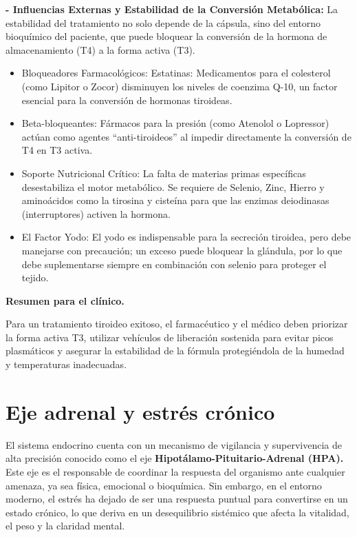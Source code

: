 \documentclass[
  spanish,
]{article}
\begin{document}
\textbf{- Influencias Externas y Estabilidad de la Conversión Metabólica:} La estabilidad del tratamiento no solo depende de la cápsula, sino del entorno bioquímico del paciente, que puede bloquear la conversión de la hormona de almacenamiento (T4) a la forma activa (T3).

\begin{itemize}
\item
  Bloqueadores Farmacológicos:
  Estatinas: Medicamentos para el colesterol (como Lipitor o Zocor) disminuyen los niveles de coenzima Q-10, un factor esencial para la conversión de hormonas tiroideas.
\item
  Beta-bloqueantes: Fármacos para la presión (como Atenolol o Lopressor) actúan como agentes ``anti-tiroideos'' al impedir directamente la conversión de T4 en T3 activa.
\item
  Soporte Nutricional Crítico: La falta de materias primas específicas desestabiliza el motor metabólico. Se requiere de Selenio, Zinc, Hierro y aminoácidos como la tirosina y cisteína para que las enzimas deiodinasas (interruptores) activen la hormona.
\item
  El Factor Yodo: El yodo es indispensable para la secreción tiroidea, pero debe manejarse con precaución; un exceso puede bloquear la glándula, por lo que debe suplementarse siempre en combinación con selenio para proteger el tejido.
\end{itemize}

\textbf{Resumen para el clínico.}

Para un tratamiento tiroideo exitoso, el farmacéutico y el médico deben priorizar la forma activa T3, utilizar vehículos de liberación sostenida para evitar picos plasmáticos y asegurar la estabilidad de la fórmula protegiéndola de la humedad y temperaturas inadecuadas.

\section{Eje adrenal y estrés crónico}\label{eje-adrenal-y-estruxe9s-cruxf3nico}

El sistema endocrino cuenta con un mecanismo de vigilancia y supervivencia de alta precisión conocido como el eje \textbf{Hipotálamo-Pituitario-Adrenal (HPA).} Este eje es el responsable de coordinar la respuesta del organismo ante cualquier amenaza, ya sea física, emocional o bioquímica. Sin embargo, en el entorno moderno, el estrés ha dejado de ser una respuesta puntual para convertirse en un estado crónico, lo que deriva en un desequilibrio sistémico que afecta la vitalidad, el peso y la claridad mental.
\end{document}
